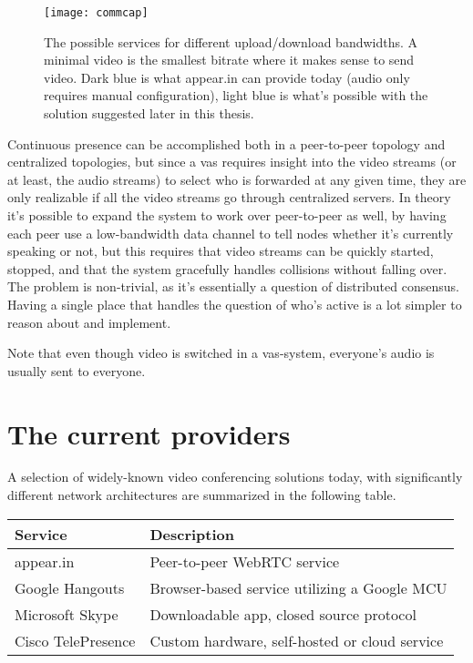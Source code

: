 \begin{figure}
    \centering
    \texttt{[image: commcap]}
    \caption{The possible services for different upload/download bandwidths. A minimal video is the smallest bitrate where it makes sense to send video. Dark blue is what appear.in can provide today (audio only requires manual configuration), light blue is what's possible with the solution suggested later in this thesis.}
    \label{fig:service-possibilities}
\end{figure}

Continuous presence can be accomplished both in a peer-to-peer topology and centralized topologies, but since a \gls{vas} requires insight into the video streams (or at least, the audio streams) to select who is forwarded at any given time, they are only realizable if all the video streams go through centralized servers. In theory it's possible to expand the system to work over peer-to-peer as well, by having each peer use a low-bandwidth data channel to tell nodes whether it's currently speaking or not, but this requires that video streams can be quickly started, stopped, and that the system gracefully handles collisions without falling over. The problem is non-trivial, as it's essentially a question of distributed consensus. Having a single place that handles the question of who's active is a lot simpler to reason about and implement.

Note that even though video is switched in a \gls{vas}-system, everyone's audio is usually sent to everyone.


\section{The current providers}

A selection of widely-known video conferencing solutions today, with significantly different network architectures are summarized in the following table.

\begin{center}
	\label{tab:existing-solutions}
	\begin{tabular}{| l | l |}
		\hline
		\textbf{Service} & \textbf{Description} \\ \hline
		appear.in & Peer-to-peer WebRTC service \\ \hline
		Google Hangouts & Browser-based service utilizing a Google MCU \\ \hline
		Microsoft Skype & Downloadable app, closed source protocol \\ \hline
		Cisco TelePresence & Custom hardware, self-hosted or cloud service \\ \hline
	\end{tabular}
\end{center}

